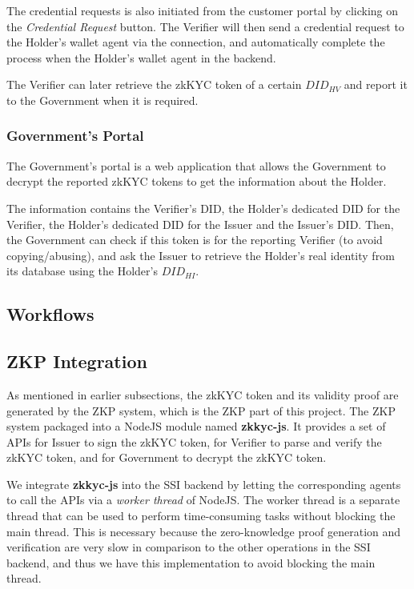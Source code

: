 \documentclass[
]{report}
\begin{document}
The credential requests is also initiated from the customer portal by
clicking on the \emph{Credential Request} button. The Verifier will then
send a credential request to the Holder's wallet agent via the connection,
and automatically complete the process when the Holder's wallet agent in
the backend.

The Verifier can later retrieve the zkKYC token of a certain ${DID_{HV}}$
and report it to the Government when it is required.

\subsubsection{Government's Portal}
The Government's portal is a web application that allows the Government to
decrypt the reported zkKYC tokens to get the information about the Holder.

The information contains the Verifier's DID, the Holder's dedicated DID for
the Verifier, the Holder's dedicated DID for the Issuer and the Issuer's
DID. Then, the Government can check if this token is for the reporting
Verifier (to avoid copying/abusing), and ask the Issuer to retrieve the
Holder's real identity from its database using the Holder's $DID_{HI}$.

\subsection{Workflows}
\subsection{ZKP Integration}
As mentioned in earlier subsections, the zkKYC token and its validity proof
are generated by the ZKP system, which is the ZKP part of this project.
The ZKP system packaged into a NodeJS module named \textbf{zkkyc-js}. It
provides a set of APIs for Issuer to sign the zkKYC token, for Verifier
to parse and verify the zkKYC token, and for Government to decrypt the
zkKYC token.

We integrate \textbf{zkkyc-js} into the SSI backend by letting the
corresponding agents to call the APIs via a \emph{worker thread} of NodeJS.
The worker thread is a separate thread that can be used to perform
time-consuming tasks without blocking the main thread. This is necessary
because the zero-knowledge proof generation and verification are very
slow in comparison to the other operations in the SSI backend, and thus
we have this implementation to avoid blocking the main thread.
\end{document}
